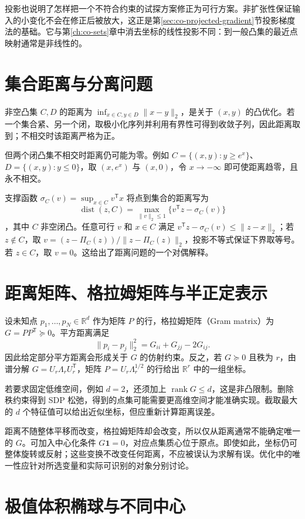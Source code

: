 投影也说明了怎样把一个不符合约束的试探方案修正为可行方案。非扩张性保证输入的小变化不会在修正后被放大，这正是第\ref{sec:co-projected-gradient}节投影梯度法的基础。它与第\ref{ch:co-sets}章中消去坐标的线性投影不同：到一般凸集的最近点映射通常是非线性的。

\section{集合距离与分离问题}

非空凸集 $C,D$ 的距离为 $\inf_{x\in C,y\in D}\|x-y\|_2$，是关于 $(x,y)$ 的凸优化。若一个集合紧、另一个闭，取极小化序列并利用有界性可得到收敛子列，因此距离取到；不相交时该距离严格为正。

但两个闭凸集不相交时距离仍可能为零。例如 $C=\{(x,y):y\geq e^x\}$、$D=\{(x,y):y\leq0\}$，取 $(x,e^x)$ 与 $(x,0)$，令 $x\to-\infty$ 即可使距离趋零，且永不相交。

支撑函数 $\sigma_C(v)=\sup_{x\in C}v^{\mathsf T}x$ 将点到集合的距离写为
\[
 \operatorname{dist}(z,C)=\max_{\|v\|_2\leq1}\{v^{\mathsf T}z-\sigma_C(v)\}
\]
，其中 $C$ 非空闭凸。任意可行 $v$ 和 $x\in C$ 满足 $v^{\mathsf T}z-\sigma_C(v)\leq\|z-x\|_2$；若 $z\notin C$，取 $v=(z-\Pi_C(z))/\|z-\Pi_C(z)\|_2$，投影不等式保证下界取等号。若 $z\in C$，取 $v=0$。这给出了距离问题的一个对偶解释。

\section{距离矩阵、格拉姆矩阵与半正定表示}

设未知点 $p_1,\ldots,p_N\in\mathbb R^d$ 作为矩阵 $P$ 的行，格拉姆矩阵（Gram matrix）为 $G=PP^{\mathsf T}\succeq0$。平方距离满足
\[
 \|p_i-p_j\|_2^2=G_{ii}+G_{jj}-2G_{ij}.
\]
因此给定部分平方距离会形成关于 $G$ 的仿射约束。反之，若 $G\succeq0$ 且秩为 $r$，由谱分解 $G=U_r\Lambda_rU_r^{\mathsf T}$，矩阵 $P=U_r\Lambda_r^{1/2}$ 的行给出 $\mathbb R^r$ 中的一组坐标。

若要求固定低维空间，例如 $d=2$，还须加上 $\operatorname{rank}G\leq d$，这是非凸限制。删除秩约束得到 SDP 松弛，得到的点集可能需要更高维空间才能准确实现。截取最大的 $d$ 个特征值可以给出近似坐标，但应重新计算距离误差。

距离不随整体平移而改变，格拉姆矩阵却会改变，所以仅从距离通常不能确定唯一的 $G$。可加入中心化条件 $G\mathbf1=0$，对应点集质心位于原点。即使如此，坐标仍可整体旋转或反射；这些变换不改变任何距离，不应被误认为求解有误。优化中的唯一性应针对所选变量和实际可识别的对象分别讨论。

\section{极值体积椭球与不同中心}

